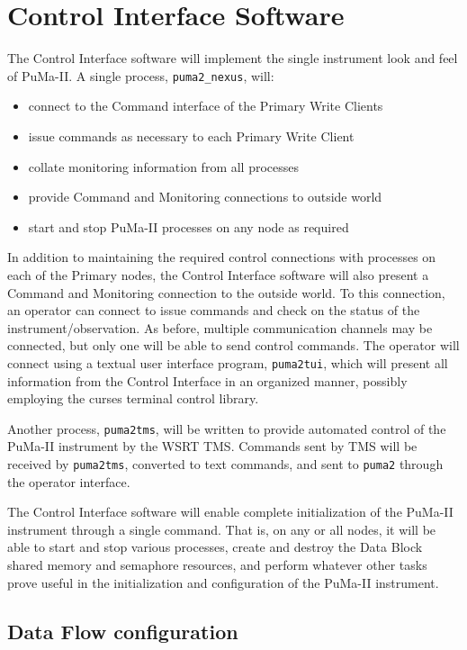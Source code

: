 \chapter{Control Interface Software}

The Control Interface software will implement the single instrument
look and feel of PuMa-II.  A single process, {\tt puma2\_nexus}, will:

\begin{itemize}
\item connect to the Command interface of the Primary Write Clients
\item issue commands as necessary to each Primary Write Client
\item collate monitoring information from all processes
\item provide Command and Monitoring connections to outside world
\item start and stop PuMa-II processes on any node as required
\end{itemize}

In addition to maintaining the required control connections with
processes on each of the Primary nodes, the Control Interface software
will also present a Command and Monitoring connection to the outside
world.  To this connection, an operator can connect to issue commands
and check on the status of the instrument/observation.  As before,
multiple communication channels may be connected, but only one will be
able to send control commands.  The operator will connect using a
textual user interface program, {\tt puma2tui}, which will present all
information from the Control Interface in an organized manner,
possibly employing the curses terminal control library.

Another process, {\tt puma2tms}, will be written to provide automated
control of the PuMa-II instrument by the WSRT TMS.  Commands sent by
TMS will be received by {\tt puma2tms}, converted to text commands,
and sent to {\tt puma2} through the operator interface.

The Control Interface software will enable complete initialization of
the PuMa-II instrument through a single command.  That is, on any or
all nodes, it will be able to start and stop various processes, create
and destroy the Data Block shared memory and semaphore resources, and
perform whatever other tasks prove useful in the initialization and
configuration of the PuMa-II instrument.

\section{Data Flow configuration}

